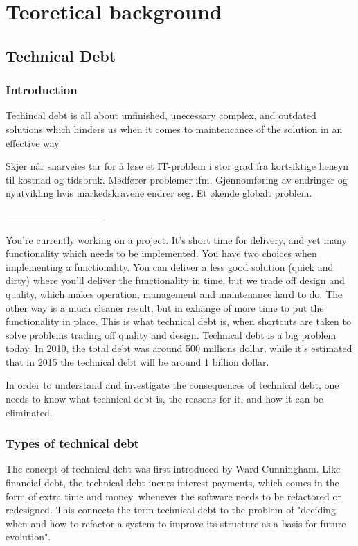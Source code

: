 \part{Teoretical background}
\chapter{Technical Debt}


\section{Introduction}
Techincal debt is all about unfinished, unecessary complex, and outdated solutions which hinders us when it comes to maintencance of the solution in an effective way. 

Skjer når snarveies tar for å løse et IT-problem i stor grad fra kortsiktige hensyn til kostnad og tidsbruk. Medfører problemer ifm. Gjennomføring av endringer og nyutvikling hvis markedskravene endrer seg. Et økende globalt problem. 







------------------------------

You're currently working on a project. It's short time for delivery, and yet many functionality which needs to be implemented. You have two choices when implementing a functionality. You can deliver a less good solution (quick and dirty) where you'll deliver the functionality in time, but we trade off design and quality, which makes operation, management and maintenance hard to do. The other way is a much cleaner result, but in exhange of more time to put the functionality in place. This is what technical debt is, when shortcuts are taken to solve problems trading off quality and design. Technical debt is a big problem today. In 2010, the total debt was around 500 millions dollar, while it's estimated that in 2015 the technical debt will be around 1 billion dollar.

In order to understand and investigate the consequences of technical debt, one needs to know what technical debt is, the reasons for it, and how it can be eliminated.

\section{Types of technical debt}
The concept of technical debt was first introduced by Ward Cunningham\cite{cunningham}. Like financial debt, the technical debt incurs interest payments, which comes in the form of extra time and money, whenever the software needs to be refactored or redesigned\cite{fowler}. This connects the term technical debt to the problem of "deciding when and how to refactor a system to improve its structure as a basis for future evolution".

